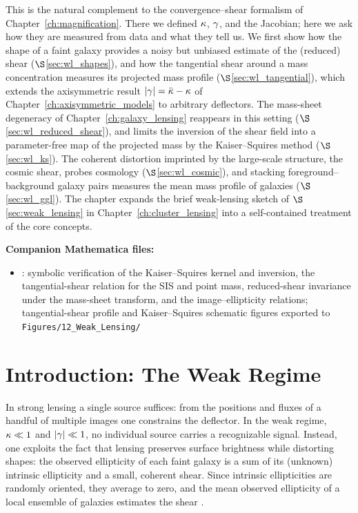 This is the natural complement to the convergence--shear formalism of
Chapter~\ref{ch:magnification}.  There we defined $\kappa$,
$\gamma$, and the Jacobian; here we ask how they are measured
from data and what they tell us.  We first show how the shape of a
faint galaxy provides a noisy but unbiased estimate of the (reduced)
shear ($\S$\ref{sec:wl_shapes}), and how the tangential shear around a
mass concentration measures its projected mass profile
($\S$\ref{sec:wl_tangential}), which extends the axisymmetric result
$|\gamma| = \bar{\kappa} - \kappa$ of
Chapter~\ref{ch:axisymmetric_models} to arbitrary deflectors.  The
mass-sheet degeneracy of Chapter~\ref{ch:galaxy_lensing} reappears in
this setting ($\S$\ref{sec:wl_reduced_shear}), and limits the inversion
of the shear field into a parameter-free map of the projected mass by
the Kaiser--Squires method ($\S$\ref{sec:wl_ks}).  The coherent
distortion imprinted by the large-scale structure, the cosmic shear,
probes cosmology ($\S$\ref{sec:wl_cosmic}), and stacking
foreground--background galaxy pairs measures the mean mass profile of
galaxies ($\S$\ref{sec:wl_ggl}).  The chapter expands the brief
weak-lensing sketch of $\S$\ref{sec:weak_lensing} in
Chapter~\ref{ch:cluster_lensing} into a self-contained treatment of the
core concepts.

\medskip
\noindent
\textbf{Companion Mathematica files:}
\begin{itemize}[nosep]
    \item {}:
          symbolic verification of the Kaiser--Squires kernel and
          inversion, the tangential-shear relation for the SIS and point
          mass, reduced-shear invariance under the mass-sheet transform,
          and the image--ellipticity relations; tangential-shear profile
          and Kaiser--Squires schematic figures exported to
          \texttt{Figures/12\_Weak\_Lensing/}
\end{itemize}


\section{Introduction: The Weak Regime}
\label{sec:wl_intro}

In strong lensing a single source suffices: from the
positions and fluxes of a handful of multiple images one constrains the
deflector.  In the weak regime, $\kappa \ll 1$ and $|\gamma| \ll 1$,
no individual source carries a recognizable signal.  Instead, one exploits
the fact that lensing preserves surface brightness while distorting shapes:
the observed ellipticity of each faint galaxy is a sum of its (unknown)
intrinsic ellipticity and a small, coherent shear.  Since intrinsic
ellipticities are randomly oriented, they average to zero, and the mean
observed ellipticity of a local ensemble of galaxies estimates the shear
\citep{schneider_kochanek_wambsganss_2006}.

